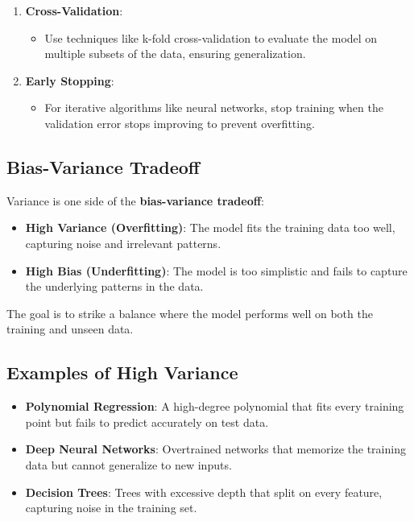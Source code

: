 \begin{enumerate}
    \item \textbf{Cross-Validation}:
    \begin{itemize}
        \item Use techniques like k-fold cross-validation to evaluate the model on multiple subsets of the data, ensuring generalization.
    \end{itemize}

    \item \textbf{Early Stopping}:
    \begin{itemize}
        \item For iterative algorithms like neural networks, stop training when the validation error stops improving to prevent overfitting.
    \end{itemize}
\end{enumerate}

\subsection*{Bias-Variance Tradeoff}
Variance is one side of the \textbf{bias-variance tradeoff}:

\begin{itemize}
    \item \textbf{High Variance (Overfitting)}: The model fits the training data too well, capturing noise and irrelevant patterns.
    \item \textbf{High Bias (Underfitting)}: The model is too simplistic and fails to capture the underlying patterns in the data.
\end{itemize}

The goal is to strike a balance where the model performs well on both the training and unseen data.

\subsection*{Examples of High Variance}
\begin{itemize}
    \item \textbf{Polynomial Regression}: A high-degree polynomial that fits every training point but fails to predict accurately on test data.
    \item \textbf{Deep Neural Networks}: Overtrained networks that memorize the training data but cannot generalize to new inputs.
    \item \textbf{Decision Trees}: Trees with excessive depth that split on every feature, capturing noise in the training set.
\end{itemize}

